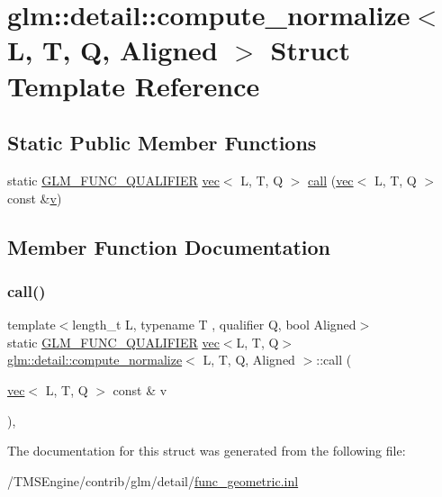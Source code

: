 \hypertarget{structglm_1_1detail_1_1compute__normalize}{}\section{glm\+:\+:detail\+:\+:compute\+\_\+normalize$<$ L, T, Q, Aligned $>$ Struct Template Reference}
\label{structglm_1_1detail_1_1compute__normalize}
\subsection*{Static Public Member Functions}
\begin{DoxyCompactItemize}
\item 
static \hyperlink{setup_8hpp_a33fdea6f91c5f834105f7415e2a64407}{G\+L\+M\+\_\+\+F\+U\+N\+C\+\_\+\+Q\+U\+A\+L\+I\+F\+I\+ER} \hyperlink{structglm_1_1vec}{vec}$<$ L, T, Q $>$ \hyperlink{structglm_1_1detail_1_1compute__normalize_aa29b26ddafc5ea1e2c7798c0caf22ed2}{call} (\hyperlink{structglm_1_1vec}{vec}$<$ L, T, Q $>$ const \&\hyperlink{_s_d_l__opengl_8h_a10a82eabcb59d2fcd74acee063775f90}{v})
\end{DoxyCompactItemize}


\subsection{Member Function Documentation}
\mbox{\label{structglm_1_1detail_1_1compute__normalize_aa29b26ddafc5ea1e2c7798c0caf22ed2}} 
\subsubsection{\texorpdfstring{call()}{call()}}
{\footnotesize\ttfamily template$<$length\+\_\+t L, typename T , qualifier Q, bool Aligned$>$ \\
static \hyperlink{setup_8hpp_a33fdea6f91c5f834105f7415e2a64407}{G\+L\+M\+\_\+\+F\+U\+N\+C\+\_\+\+Q\+U\+A\+L\+I\+F\+I\+ER} \hyperlink{structglm_1_1vec}{vec}$<$L, T, Q$>$ \hyperlink{structglm_1_1detail_1_1compute__normalize}{glm\+::detail\+::compute\+\_\+normalize}$<$ L, T, Q, Aligned $>$\+::call (\begin{DoxyParamCaption}\item[{\hyperlink{structglm_1_1vec}{vec}$<$ L, T, Q $>$ const \&}]{v }\end{DoxyParamCaption})\hspace{0.3cm}{\ttfamily [inline]}, {\ttfamily [static]}}



The documentation for this struct was generated from the following file\+:\begin{DoxyCompactItemize}
\item 
/\+T\+M\+S\+Engine/contrib/glm/detail/\hyperlink{func__geometric_8inl}{func\+\_\+geometric.\+inl}\end{DoxyCompactItemize}
